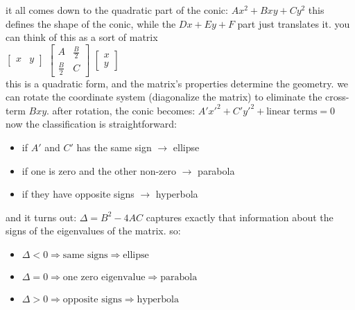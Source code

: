 \documentclass{article}
\begin{document}
it all comes down to the quadratic part of the conic: $Ax^2 + Bxy + Cy^2$ this defines the shape of the conic, while the $Dx + Ey + F$ part just translates it. you can think of this as a sort of matrix\\

$
\begin{bmatrix}
x & y
\end{bmatrix}
$
$
\begin{bmatrix}
A & \frac{B}{2}\\
\frac{B}{2} & C
\end{bmatrix}
$
$
\begin{bmatrix}
x\\
y
\end{bmatrix}
$\\

this is a quadratic form, and the matrix's properties determine the geometry. we can rotate the coordinate system (diagonalize the matrix) to eliminate the cross-term $Bxy$. after rotation, the conic becomes: $A'x'^2 + C'y'^2 + \text{linear terms} = 0$ now the classification is straightforward:
	\begin{itemize}
		\item if $A'$ and $C'$ has the same sign $\rightarrow$ ellipse
		\item if one is zero and the other non-zero $\rightarrow$ parabola
		\item if they have opposite signs $\rightarrow$ hyperbola
	\end{itemize}
and it turns out: $\Delta = B^2 - 4AC$ captures exactly that information about the signs of the eigenvalues of the matrix. so:
	\begin{itemize}
		\item $\Delta < 0 \Rightarrow \text{same signs} \Rightarrow \text{ellipse}$
		\item $\Delta = 0 \Rightarrow \text{one zero eigenvalue} \Rightarrow \text{parabola}$ 
		\item $\Delta > 0 \Rightarrow \text{opposite signs} \Rightarrow \text{hyperbola}$ 
	\end{itemize}
\end{document}
